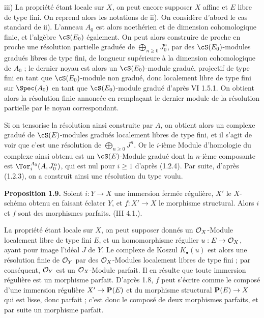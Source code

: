 iii) La propriété étant locale sur \(X\), on peut encore supposer \(X\) affine et \(E\) libre de type fini. On reprend alors les notations de ii). On considère d'abord le cas standard de ii). L'anneau \(A_0\) est alors noethérien et de dimension cohomologique finie, et l'algèbre \(\cS(E_0)\)
également. On peut alors construire de proche en proche une résolution partielle graduée de \(\bigoplus_{n\ge0}J_0^n\), par des \(\cS(E_0)\)-modules gradués libres de type fini, de longueur supérieure à la dimension cohomologique de \(A_0\) ; le dernier noyau est alors un \(\cS(E_0)\)-module gradué, projectif de type fini en tant que \(\cS(E_0)\)-module non gradué, donc localement libre de type fini sur \(\Spec(A_0)\) en tant que \(\cS(E_0)\)-module gradué d'après VI 1.5.1. On obtient alors la résolution finie annoncée en remplaçant le dernier module de la résolution partielle par le noyau correspondant.

Si on tensorise la résolution ainsi construite par \(A\), on obtient alors un complexe gradué de \(\cS(E)\)-modules gradués localement libres de type fini, et il s'agit de voir que c'est une résolution de \(\bigoplus_{n\ge0}J^n\). Or le \(i\)-ième Module d'homologie du complexe ainsi obtenu est un \(\cS(E)\)-Module gradué dont la \(n\)-ième composante est \(\Tor_i^{A_0}(A,J_0^n)\), qui est nul pour \(i\ge1\) d'après (1.2.4). Par suite, d'après (1.2.3), on a construit ainsi une résolution du type voulu.

\textbf{Proposition 1.9.} Soient \(i:Y\to X\) une immersion fermée régulière, \(X'\) le \(X\)-schéma obtenu en faisant éclater \(Y\), et \(f:X'\to X\) le morphisme structural. Alors \(i\) et \(f\) sont des morphismes parfaits. (III 4.1.).

La propriété étant locale sur \(X\), on peut supposer donnés un \(\mathcal O_X\)-Module localement libre de type fini \(E\), et un homomorphisme régulier \(u:E\to\mathcal O_X\), ayant pour image l'idéal \(J\) de \(Y\). Le complexe de Koszul \(K_\bullet(u)\) est alors une résolution finie de \(\mathcal O_Y\) par des \(\mathcal O_X\)-Modules localement libres de type fini ; par conséquent, \(\mathcal O_Y\) est un \(\mathcal O_X\)-Module parfait. Il en résulte que toute immersion régulière est un morphisme parfait. D'après 1.8, \(f\) peut s'écrire comme le composé d'une immersion régulière \(X'\to\mathbf P(E)\) et du morphisme structural \(\mathbf P(E)\to X\) qui est lisse, donc parfait ; c'est donc le
composé de deux morphismes parfaits, et par suite un morphisme parfait.

